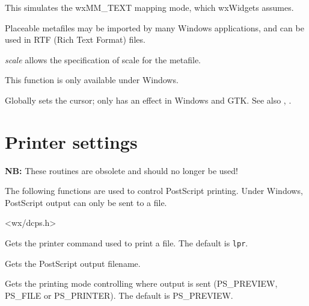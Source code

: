 This simulates the wxMM\_TEXT mapping mode, which wxWidgets assumes.

Placeable metafiles may be imported by many Windows applications, and can be
used in RTF (Rich Text Format) files.

{\it scale} allows the specification of scale for the metafile.

This function is only available under Windows.


\label{wxsetcursor}


Globally sets the cursor; only has an effect in Windows and GTK.
See also , .



\section{Printer settings}\label{printersettings}

{\bf NB:} These routines are obsolete and should no longer be used!

The following functions are used to control PostScript printing. Under
Windows, PostScript output can only be sent to a file.


<wx/dcps.h>


\label{wxgetprintercommand}


Gets the printer command used to print a file. The default is {\tt lpr}.


\label{wxgetprinterfile}


Gets the PostScript output filename.


\label{wxgetprintermode}


Gets the printing mode controlling where output is sent (PS\_PREVIEW, PS\_FILE or PS\_PRINTER).
The default is PS\_PREVIEW.


\label{wxgetprinteroptions}


